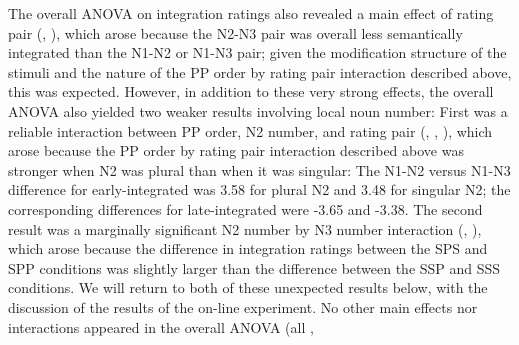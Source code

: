 \documentclass[12pt,titlepage]{article}
\newcommand{\IGNORE}[1]{} %
\newcommand{\showp}[1]{\IGNORE{#1}} %
\begin{document}
The overall ANOVA on integration ratings also revealed a main effect of
rating pair (, \showp{, \p{001}}), which arose
because the N2-N3 pair was overall less semantically integrated than the
N1-N2 or N1-N3 pair; given the modification structure of the stimuli and
the nature of the PP order by rating pair interaction described above, this
was expected.  However, in addition to these very strong effects, the
overall ANOVA also yielded two weaker results involving local noun number:
First was a reliable interaction between PP order, N2 number, and rating
pair (, , ), which arose because the PP
order by rating pair interaction described above was stronger when N2 was
plural than when it was singular: The N1-N2 versus N1-N3 difference for
early-integrated was 3.58 for plural N2 and 3.48 for singular N2; the
corresponding differences for late-integrated were -3.65 and -3.38.  The
second result was a marginally significant N2 number by N3 number
interaction (, ), which arose because the
difference in integration ratings between the SPS and SPP conditions was
slightly larger than the difference between the SSP and SSS conditions.  We
will return to both of these unexpected results below, with the discussion
of the results of the on-line experiment.  No other main effects nor
interactions appeared in the overall ANOVA (all \Fsweak[2.6],
\end{document}
